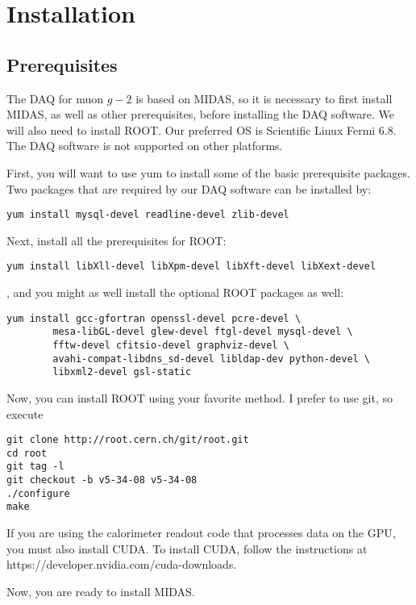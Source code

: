 \section{Installation}

\subsection{Prerequisites}
The DAQ for muon $g-2$ is based on MIDAS, so it is necessary to first install MIDAS, as well as other prerequisites, before installing the DAQ software. We will also need to install ROOT. Our preferred OS is Scientific Linux Fermi 6.8. The DAQ software is not supported on other platforms.

First, you will want to use yum to install some of the basic prerequisite packages. Two packages that are required by our DAQ software can be installed by:

\begin{verbatim}
yum install mysql-devel readline-devel zlib-devel
\end{verbatim}

Next, install all the prerequisites for ROOT:

\begin{verbatim}
yum install libXll-devel libXpm-devel libXft-devel libXext-devel
\end{verbatim}

, and you might as well install the optional ROOT packages as well:

\begin{verbatim}
yum install gcc-gfortran openssl-devel pcre-devel \
        mesa-libGL-devel glew-devel ftgl-devel mysql-devel \
        fftw-devel cfitsio-devel graphviz-devel \
        avahi-compat-libdns_sd-devel libldap-dev python-devel \
        libxml2-devel gsl-static
\end{verbatim}

Now, you can install ROOT using your favorite method. I prefer to use git, so execute

\begin{verbatim}
git clone http://root.cern.ch/git/root.git
cd root
git tag -l
git checkout -b v5-34-08 v5-34-08
./configure
make
\end{verbatim}

If you are using the calorimeter readout code that processes data on the GPU, you must also install CUDA. To install CUDA, follow the instructions at https://developer.nvidia.com/cuda-downloads.

Now, you are ready to install MIDAS.


